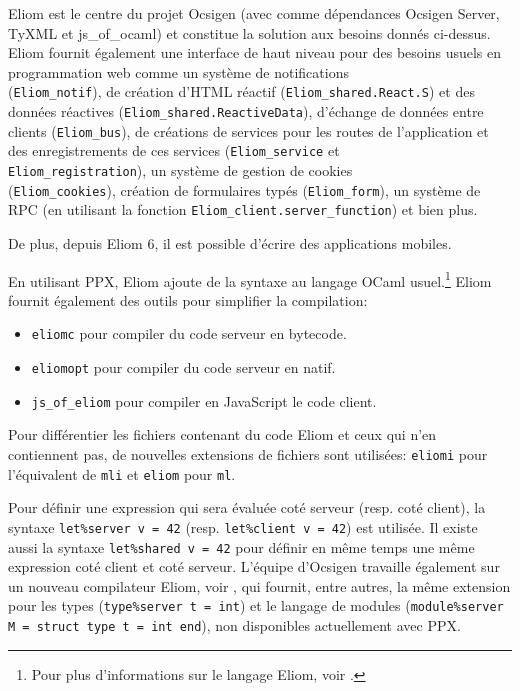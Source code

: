 Eliom est le centre du projet Ocsigen (avec comme dépendances Ocsigen Server,
TyXML et js\_of\_ocaml) et constitue la solution aux besoins donnés ci-dessus.
Eliom fournit également une interface de haut
niveau pour des besoins usuels en programmation web comme un système de
notifications \\ (\verb|Eliom_notif|), de création d'HTML réactif
(\verb|Eliom_shared.React.S|) et des données réactives
(\verb|Eliom_shared.ReactiveData|), d'échange de données entre clients
(\verb|Eliom_bus|), de créations de services pour les routes de l'application et
des enregistrements de ces services (\verb|Eliom_service| et \\
\verb|Eliom_registration|), un système de gestion de cookies
\\ (\verb|Eliom_cookies|), création de formulaires typés
(\verb|Eliom_form|), un système de RPC (en utilisant la fonction
\verb|Eliom_client.server_function|) et bien plus.

De plus, depuis Eliom 6, il est possible d'écrire des applications mobiles.

En utilisant PPX, Eliom ajoute de la syntaxe au langage OCaml usuel.\footnote{Pour plus
d'informations sur le langage Eliom, voir \cite{gabriel-radanne-paper-eliom}.}
Eliom fournit également des outils pour simplifier la compilation:
\begin{itemize}
  \item \verb|eliomc| pour compiler du code serveur en bytecode.
  \item \verb|eliomopt| pour compiler du code serveur en natif.
  \item \verb|js_of_eliom| pour compiler en JavaScript le code client.
\end{itemize}

Pour différentier les fichiers contenant du code Eliom et ceux qui n'en \\
contiennent pas, de nouvelles extensions de fichiers sont utilisées: \verb|eliomi|
pour l'équivalent de \verb|mli| et \verb|eliom| pour \verb|ml|.

Pour définir une expression qui sera évaluée coté serveur (resp. coté client), la syntaxe
\verb|let%server v = 42| (resp. \verb|let%client v = 42|) est utilisée. Il
existe aussi la syntaxe \verb|let%shared v = 42| pour définir en même temps une
même expression coté client et coté serveur. L'équipe d'Ocsigen travaille
également sur un nouveau compilateur Eliom, voir
\cite{ocsigen-eliomlang-github}, qui fournit, entre autres, la même extension
pour les types (\verb|type%server t = int|) et le langage de modules
(\verb|module%server M = struct type t = int end|), non disponibles actuellement avec PPX.

